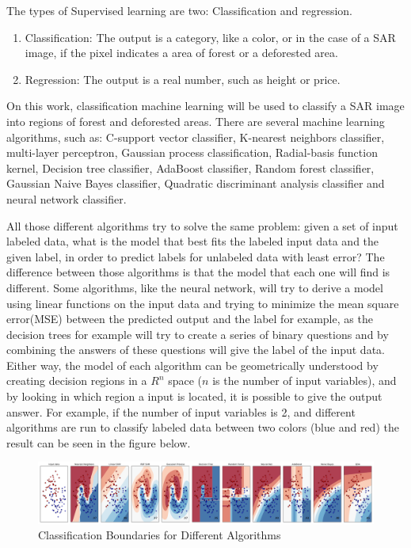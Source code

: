 The types of Supervised learning are two: Classification and regression.
\begin{enumerate}
    \item Classification: The output is a category, like a color, or in the case of a SAR image, if the pixel indicates a area of forest or a deforested area.
    \item Regression: The output is a real number, such as height or price.
\end{enumerate}{}

On this work, classification machine learning will be used to classify a SAR image into regions of forest and deforested areas. \newline
There are several machine learning algorithms, such as: C-support vector classifier, K-nearest neighbors classifier, multi-layer perceptron, Gaussian process classification, Radial-basis function kernel, Decision tree classifier, AdaBoost classifier, Random forest classifier, Gaussian Naive Bayes classifier, Quadratic discriminant analysis classifier and neural network classifier.\newline

All those different algorithms try to solve the same problem: given a set of input labeled data, what is the model that best fits the labeled input data and the given label, in order to predict labels for unlabeled data with least error?\newline
The difference between those algorithms is that the model that each one will find is different. Some algorithms, like the neural network, will try to derive a model using linear functions on the input data and trying to minimize the mean square error(MSE) between the predicted output and the label for example, as the decision trees for example will try to create a series of binary questions and by combining the answers of these questions will give the label of the input data.
\newline
Either way, the model of each algorithm can be geometrically understood by creating decision regions in a $R^n$ space ($n$ is the number of input variables), and by looking in which region a input is located, it is possible to give the output answer.
\newline
For example, if the number of input variables is 2, and different algorithms are run to classify labeled data between two colors (blue and red) the result can be seen in the figure below.

\begin{figure}[H]
    \centering
    \includegraphics[width=\linewidth]{Chapter3/regions.pdf}
    \caption{Classification Boundaries for Different Algorithms}
    \label{fig:machine_learning_classification}
\end{figure}{}

